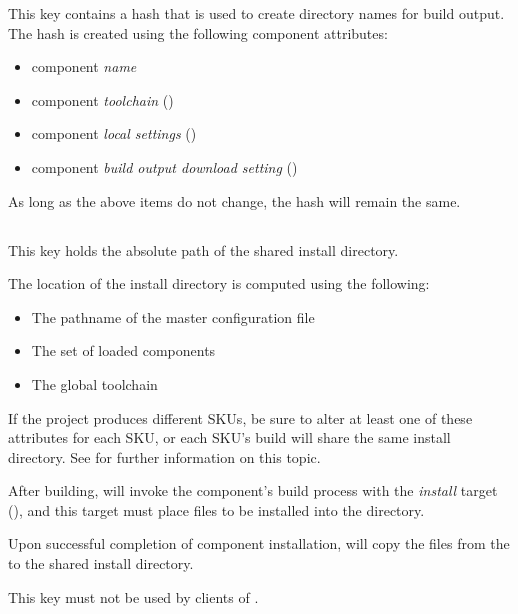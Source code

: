 This key contains a hash that is used to create directory names for
build output.  The hash is created using the following component
attributes:

\begin{itemize}
\item component \emph{name}
\item component \emph{toolchain} ()
\item component \emph{local settings} ()
\item component \emph{build output download setting}
  ()
\end{itemize}

As long as the above items do not change, the hash will remain the
same.

\subsection{}\label{variables:install-directory}

This key holds the absolute path of the shared install directory.

The location of the install directory is computed using the following:

\begin{itemize}
\item{The pathname of the master configuration file}
\item{The set of loaded components}
\item{The global toolchain}
\end{itemize}

If the project produces different SKUs, be sure to alter at least one
of these attributes for each SKU, or each SKU's build will share the
same install directory.  See  for further
information on this topic.

After building, \lmsbw will invoke the component's build process with
the \emph{install} target (), and this
target must place files to be installed into the \destdir directory.

Upon successful completion of component installation, \lmsbw will copy
the files from the \destdir to the shared install directory.

This key must not be used by clients of \lmsbw.


